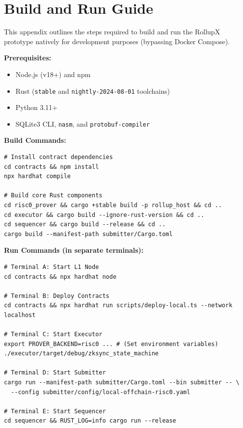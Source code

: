 \chapter{Build and Run Guide}
\label{app:build_run_guide}
This appendix outlines the steps required to build and run the RollupX prototype natively for development purposes (bypassing Docker Compose).

\textbf{Prerequisites:}
\begin{itemize}
    \item Node.js (v18+) and npm
    \item Rust (\texttt{stable} and \texttt{nightly-2024-08-01} toolchains)
    \item Python 3.11+
    \item SQLite3 CLI, \texttt{nasm}, and \texttt{protobuf-compiler}
\end{itemize}

\textbf{Build Commands:}
\begin{lstlisting}[style=yamlStyle]
# Install contract dependencies
cd contracts && npm install
npx hardhat compile

# Build core Rust components
cd risc0_prover && cargo +stable build -p rollup_host && cd ..
cd executor && cargo build --ignore-rust-version && cd ..
cd sequencer && cargo build --release && cd ..
cargo build --manifest-path submitter/Cargo.toml
\end{lstlisting}

\textbf{Run Commands (in separate terminals):}
\begin{lstlisting}[style=yamlStyle]
# Terminal A: Start L1 Node
cd contracts && npx hardhat node

# Terminal B: Deploy Contracts
cd contracts && npx hardhat run scripts/deploy-local.ts --network localhost

# Terminal C: Start Executor
export PROVER_BACKEND=risc0 ... # (Set environment variables)
./executor/target/debug/zksync_state_machine

# Terminal D: Start Submitter
cargo run --manifest-path submitter/Cargo.toml --bin submitter -- \
  --config submitter/config/local-offchain-risc0.yaml

# Terminal E: Start Sequencer
cd sequencer && RUST_LOG=info cargo run --release
\end{lstlisting}